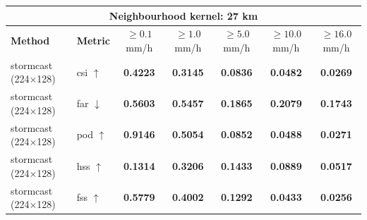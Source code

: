 \documentclass[border=10pt]{standalone}
\begin{document}
\begin{tabular}{llccccc}
\toprule
\multicolumn{7}{c}{\textbf{Neighbourhood kernel: 27 km}} \\
\midrule
\textbf{Method} & \textbf{Metric} & $\geq 0.1$ mm/h & $\geq 1.0$ mm/h & $\geq 5.0$ mm/h & $\geq 10.0$ mm/h & $\geq 16.0$ mm/h \\
\midrule
stormcast (224$\times$128) & csi $\uparrow$ & \textbf{0.4223} & \textbf{0.3145} & \textbf{0.0836} & \textbf{0.0482} & \textbf{0.0269} \\
\midrule
stormcast (224$\times$128) & far $\downarrow$ & \textbf{0.5603} & \textbf{0.5457} & \textbf{0.1865} & \textbf{0.2079} & \textbf{0.1743} \\
\midrule
stormcast (224$\times$128) & pod $\uparrow$ & \textbf{0.9146} & \textbf{0.5054} & \textbf{0.0852} & \textbf{0.0488} & \textbf{0.0271} \\
\midrule
stormcast (224$\times$128) & hss $\uparrow$ & \textbf{0.1314} & \textbf{0.3206} & \textbf{0.1433} & \textbf{0.0889} & \textbf{0.0517} \\
\midrule
stormcast (224$\times$128) & fss $\uparrow$ & \textbf{0.5779} & \textbf{0.4002} & \textbf{0.1292} & \textbf{0.0433} & \textbf{0.0256} \\
\bottomrule
\end{tabular}
\end{document}

